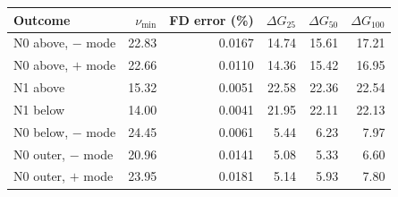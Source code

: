 \begin{tabular}{lrrrrr}\toprule
Outcome & $\nu_{\min}$ & FD error (\%) & $\Delta G_{25}$ & $\Delta G_{50}$ & $\Delta G_{100}$\\\midrule
N0 above, $-$ mode & 22.83 & 0.0167 & 14.74 & 15.61 & 17.21\\
N0 above, $+$ mode & 22.66 & 0.0110 & 14.36 & 15.42 & 16.95\\
N1 above & 15.32 & 0.0051 & 22.58 & 22.36 & 22.54\\
N1 below & 14.00 & 0.0041 & 21.95 & 22.11 & 22.13\\
N0 below, $-$ mode & 24.45 & 0.0061 & 5.44 & 6.23 & 7.97\\
N0 outer, $-$ mode & 20.96 & 0.0141 & 5.08 & 5.33 & 6.60\\
N0 outer, $+$ mode & 23.95 & 0.0181 & 5.14 & 5.93 & 7.80\\
\bottomrule\end{tabular}
